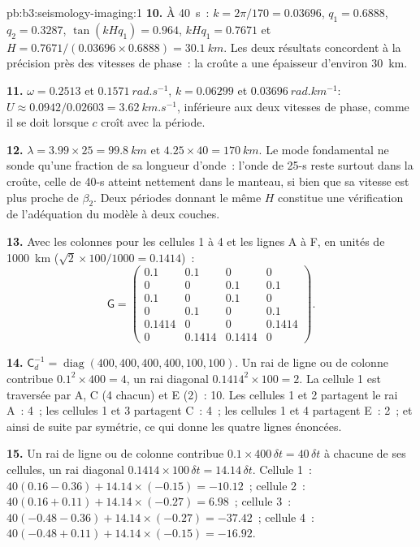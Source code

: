 \begin{solution}{pb:b3:seismology-imaging:1}
\textbf{10.} À \qty{40}{s}~: $k = 2\pi/170 = 0.03696$, $q_1 = 0.6888$,
$q_2 = 0.3287$, $\tan(kHq_1) = 0.964$, $kHq_1 = 0.7671$ et
$H = 0.7671/(0.03696\times0.6888) = \qty{30.1}{km}$. Les deux résultats concordent
à la précision près des vitesses de phase~: la croûte a une épaisseur d'environ \qty{30}{km}.

\textbf{11.} $\omega = 0.2513$ et $\qty{0.1571}{rad.s^{-1}}$, $k = 0.06299$ et
$\qty{0.03696}{rad.km^{-1}}$: $U \approx 0.0942/0.02603 = \qty{3.62}{km.s^{-1}}$,
inférieure aux deux vitesses de phase, comme il se doit lorsque $c$ croît avec la
période.

\textbf{12.} $\lambda = 3.99\times25 = \qty{99.8}{km}$ et $4.25\times40 =
\qty{170}{km}$. Le mode fondamental ne sonde qu'une fraction de sa
longueur d'onde~: l'onde de 25-s reste surtout dans la croûte, celle de 40-s atteint nettement
dans le manteau, si bien que sa vitesse est plus proche de $\beta_2$. Deux périodes donnant le
même $H$ constitue une vérification de l'adéquation du modèle à deux couches.

\textbf{13.} Avec les colonnes pour les cellules 1 à 4 et les lignes A à F, en unités
de \qty{1000}{km} ($\sqrt2\times100/1000 = 0.1414$)~:
\[
  \mathsf G = \begin{pmatrix}
  0.1 & 0.1 & 0 & 0 \\ 0 & 0 & 0.1 & 0.1 \\ 0.1 & 0 & 0.1 & 0 \\
  0 & 0.1 & 0 & 0.1 \\ 0.1414 & 0 & 0 & 0.1414 \\ 0 & 0.1414 & 0.1414 & 0
  \end{pmatrix}.
\]

\textbf{14.} $\mathsf C_d^{-1} = \operatorname{diag}(400, 400, 400, 400, 100,
100)$. Un rai de ligne ou de colonne contribue $0.1^2\times400 = 4$, un rai diagonal
$0.1414^2\times100 = 2$. La cellule 1 est traversée par A, C (4 chacun) et E (2)~: 10. Les cellules
1 et 2 partagent le rai A~: 4~; les cellules 1 et 3 partagent C~: 4~; les cellules 1 et 4 partagent E~: 2~; et
ainsi de suite par symétrie, ce qui donne les quatre lignes énoncées.

\textbf{15.} Un rai de ligne ou de colonne contribue $0.1\times400\,\delta t = 40\,
\delta t$ à chacune de ses cellules, un rai diagonal $0.1414\times100\,\delta t =
14.14\,\delta t$. Cellule 1~: $40(0.16 - 0.36) + 14.14\times(-0.15) = -10.12$~; cellule
2~: $40(0.16 + 0.11) + 14.14\times(-0.27) = 6.98$~; cellule 3~: $40(-0.48 - 0.36) +
14.14\times(-0.27) = -37.42$~; cellule 4~: $40(-0.48 + 0.11) + 14.14\times(-0.15) =
-16.92$.


\end{solution}
